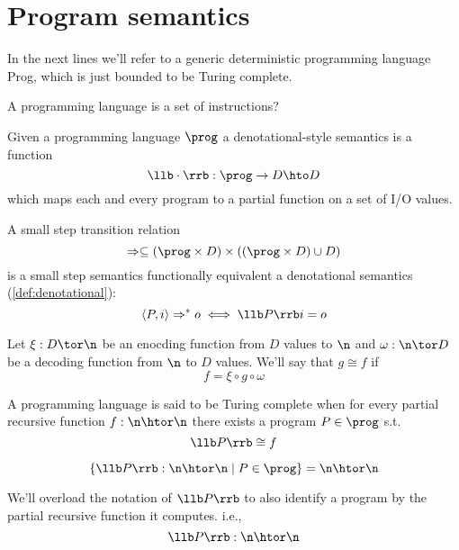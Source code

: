 \section{Program semantics}
In the next lines we'll refer to a generic deterministic programming
language Prog, which is just bounded to be Turing complete.

\begin{definition}
  A programming language is a set of instructions?
\end{definition}

\begin{definition}\label{def:denotational}
  Given a programming language \(\prog\) a denotational-style
  semantics is a function \[ \llb \cdot \rrb : \prog \to D \hto D\]
  which maps each and every program to a partial function on a set of
  I/O values.
\end{definition}

\begin{definition}
  A small step transition relation \[\Rightarrow \subseteq (\prog
  \times D) \times ((\prog \times D) \cup D)\] is a small step
  semantics functionally equivalent a denotational semantics
  (\ref{def:denotational}): \[\langle P, i \rangle \Rightarrow^* o
  \iff \llb P \rrb i = o\]
\end{definition}

\begin{notation}
  Let \(\xi : D \tor \n\) be an enocding function from \(D\) values to
  \(\n\) and \(\omega : \n \tor D\) be a decoding function from \(\n\)
  to \(D\) values. We'll say that \(g \cong f\) if \[f = \xi \circ g
  \circ \omega\]
\end{notation}

\begin{definition}\label{def:turingc}
  A programming language is said to be Turing complete when for every
  partial recursive function \(f : \n \htor \n\) there exists a
  program \(P\in \prog\) s.t. \[\llb P \rrb \cong f\]

  \begin{observation}
    \[\{\llb P \rrb : \n \htor \n \mid P \in \prog\} = \n \htor \n\]
  \end{observation}
\end{definition}

\begin{notation}[I/O semantics]
  We'll overload the notation of \(\llb P\rrb\) to also identify a
  program by the partial recursive function it computes. i.e., \[\llb
  P \rrb : \n \htor \n\]
\end{notation}

